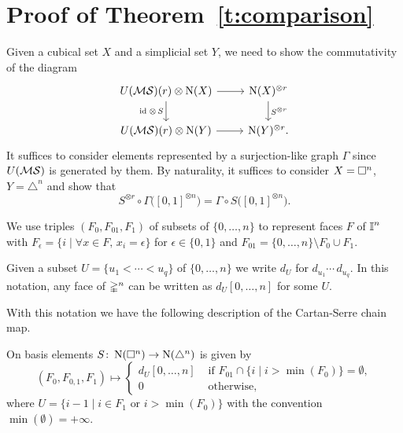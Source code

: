 
\section{Proof of Theorem~\ref{t:comparison}} \label{s:proof2}

Given a cubical set $X$ and a simplicial set $Y$, we need to show the commutativity of the diagram
\begin{equation*}
\begin{tikzcd}
U(\MS)(r) \otimes \cchains(X) \arrow[r] \arrow[d, "\id\; \otimes\, S"'] &
\cchains(X)^{\otimes r} \arrow[d, "S^{\otimes r}"] \\
U(\MS)(r) \otimes \cchains(Y) \arrow[r] &
\cchains(Y)^{\otimes r}.
\end{tikzcd}
\end{equation*}
It suffices to consider elements represented by a surjection-like graph $\Gamma$ since $U(\mathcal{MS})$ is generated by them.
By naturality, it suffices to consider $X = \square^n$, $Y = \triangle^n$ and show that
\begin{equation} \label{e:cartan-serre U(MS)-coalgebra map}
S^{\otimes r} \circ \Gamma\big( [0,1]^{\otimes n} \big) = \Gamma \circ S \big( [0,1]^{\otimes n} \big).
\end{equation}

We use triples $(F_0, F_{01}, F_1)$ of subsets of $\{0, \dots, n\}$ to represent faces $F$ of $\bm{\mathbb{I}}^n$ with $F_\epsilon = \{i \mid \forall x \in F, \, x_i = \epsilon\}$ for $\epsilon \in \{0,1\}$ and $F_{01} = \{0, \dots, n\} \setminus F_0 \cup F_1$.


Given a subset $U = \{u_1 < \cdots < u_q\}$ of $\{0, \dots, n\}$ we write $d_U$ for $d_{u_1} \! \cdots \, d_{u_q}$.
In this notation, any face of $\mathbb{\Delta}^n$ can be written as $d_U [0, \dots, n]$ for some $U$.

With this notation we have the following description of the Cartan-Serre chain map.

\begin{lemma}
	On basis elements $S \colon \operatorname{N}(\square^n) \to \operatorname{N}(\triangle^n)$ is given by
	\begin{equation*}
	(F_0, F_{0,1}, F_1) \mapsto
	\begin{cases}
	d_U [0, \dots, n] & \text{ if } F_{01} \cap \{i \mid i > \min(F_0)\} = \emptyset, \\
	0 & \text{ otherwise},
	\end{cases}
	\end{equation*}
	where $U = \{i-1 \mid i \in F_1 \text{ or } i > \min(F_0)\}$ with the convention $\min(\emptyset) = +\infty$.
\end{lemma}

